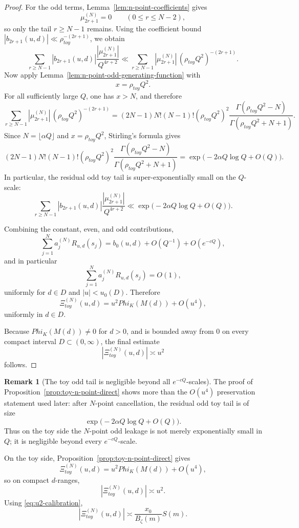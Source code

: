 \documentclass[11pt,a4paper]{amsart}
\def\Phi{Phi}%
\def\toy{toy}%
\theoremstyle{plain}
\theoremstyle{definition}
\newtheorem{remark}[theorem]{Remark}
\newcommand{\toy}{\mathrm{toy}}
\begin{document}
\begin{proof}
For the odd terms, Lemma~\ref{lem:n-point-coefficients} gives
\[
\mu_{2r+1}^{(N)}=0
\qquad (0\le r\le N-2),
\]
so only the tail $r\ge N-1$ remains. Using the coefficient bound
$|b_{2r+1}(u,d)|\ll \rho_{\toy}^{-(2r+1)}$, we obtain
\[
\sum_{r\ge N-1}
|b_{2r+1}(u,d)|\frac{|\mu_{2r+1}^{(N)}|}{Q^{4r+2}}
\ll
\sum_{r\ge N-1}
|\mu_{2r+1}^{(N)}|\,(\rho_{\toy}Q^2)^{-(2r+1)}.
\]
Now apply Lemma~\ref{lem:n-point-odd-generating-function} with
\[
x=\rho_{\toy}Q^2.
\]
For all sufficiently large $Q$, one has $x>N$, and therefore
\[
\sum_{r\ge N-1}
|\mu_{2r+1}^{(N)}|\,(\rho_{\toy}Q^2)^{-(2r+1)}
=
(2N-1)N!(N-1)!(\rho_{\toy}Q^2)^2
\frac{\Gamma(\rho_{\toy}Q^2-N)}{\Gamma(\rho_{\toy}Q^2+N+1)}.
\]
Since $N=\lfloor \alpha Q\rfloor$ and $x=\rho_{\toy}Q^2$, Stirling's
formula gives
\[
(2N-1)N!(N-1)!(\rho_{\toy}Q^2)^2
\frac{\Gamma(\rho_{\toy}Q^2-N)}{\Gamma(\rho_{\toy}Q^2+N+1)}
=
\exp\!\bigl(-2\alpha Q\log Q+O(Q)\bigr).
\]
In particular, the residual odd toy tail is super-exponentially small on the
$Q$-scale:
\[
\sum_{r\ge N-1}
|b_{2r+1}(u,d)|\frac{|\mu_{2r+1}^{(N)}|}{Q^{4r+2}}
\ll
\exp\!\bigl(-2\alpha Q\log Q+O(Q)\bigr).
\]

Combining the constant, even, and odd contributions,
\[
\sum_{j=1}^N a_j^{(N)}R_{u,d}(s_j)
=
b_0(u,d)+O(Q^{-1})+O(e^{-cQ}),
\]
and in particular
\[
\sum_{j=1}^N a_j^{(N)}R_{u,d}(s_j)=O(1),
\]
uniformly for $d\in D$ and $|u|<u_0(D)$. Therefore
\[
\Xi_{\toy}^{(N)}(u,d)
=
u^2\Phi_K(M(d))+O(u^4),
\]
uniformly in $d\in D$.

Because $\Phi_K(M(d))\neq 0$ for $d>0$, and is bounded away from $0$ on
every compact interval $D\subset(0,\infty)$, the final estimate
\[
|\Xi_{\toy}^{(N)}(u,d)|\asymp u^2
\]
follows.
\end{proof}

\begin{remark}[The toy odd tail is negligible beyond all $e^{-cQ}$-scales]
\label{rem:toy-odd-tail-superexp}
The proof of Proposition~\ref{prop:toy-n-point-direct} shows more than the
$O(u^4)$ preservation statement used later: after $N$-point cancellation,
the residual odd toy tail is of size
\[
\exp\!\bigl(-2\alpha Q\log Q+O(Q)\bigr).
\]
Thus on the toy side the $N$-point odd leakage is not merely exponentially
small in $Q$; it is negligible beyond every $e^{-cQ}$-scale.
\end{remark}

On the toy side, Proposition~\ref{prop:toy-n-point-direct} gives
\begin{equation}\label{eq:Xi-toy}
\Xi_{\toy}^{(N)}(u,d)=u^2\Phi_K(M(d))+O(u^4),
\end{equation}
so on compact $d$-ranges,
\[
|\Xi_{\toy}^{(N)}(u,d)|\asymp u^2.
\]
Using \eqref{eq:u2-calibration},
\begin{equation}\label{eq:Xi-toy-calibrated}
|\Xi_{\toy}^{(N)}(u,d)|\asymp \frac{x_0}{B_\zeta(m)}S(m).
\end{equation}
\end{document}
